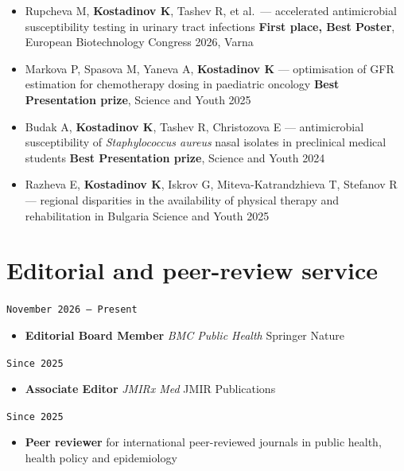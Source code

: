 \documentclass[
  10.5pt,
  a4paper,
  DIV=11,
  numbers=noendperiod]{scrartcl}
\providecommand{\tightlist}{%
  \setlength{\itemsep}{0pt}\setlength{\parskip}{0pt}}
\let\oldtexttt\texttt
\renewcommand{\texttt}[1]{{\color{cvbronze}\small\oldtexttt{#1}}}
\begin{document}
\begin{itemize}
\tightlist
\item
  Rupcheva M, \textbf{Kostadinov K}, Tashev R, et al.~--- accelerated
  antimicrobial susceptibility testing in urinary tract infections
  \textbar{} \textbf{First place, Best Poster}, European Biotechnology
  Congress 2026, Varna
\item
  Markova P, Spasova M, Yaneva A, \textbf{Kostadinov K} --- optimisation
  of GFR estimation for chemotherapy dosing in paediatric oncology
  \textbar{} \textbf{Best Presentation prize}, Science and Youth 2025
\item
  Budak A, \textbf{Kostadinov K}, Tashev R, Christozova E ---
  antimicrobial susceptibility of \emph{Staphylococcus aureus} nasal
  isolates in preclinical medical students \textbar{} \textbf{Best
  Presentation prize}, Science and Youth 2024
\item
  Razheva E, \textbf{Kostadinov K}, Iskrov G, Miteva-Katrandzhieva T,
  Stefanov R --- regional disparities in the availability of physical
  therapy and rehabilitation in Bulgaria \textbar{} Science and Youth
  2025
\end{itemize}

\section{Editorial and peer-review
service}\label{editorial-and-peer-review-service}

\texttt{November\ 2026\ –\ Present}

\begin{itemize}
\tightlist
\item
  \textbf{Editorial Board Member} \textbar{} \emph{BMC Public Health}
  \textbar{} Springer Nature
\end{itemize}

\texttt{Since\ 2025}

\begin{itemize}
\tightlist
\item
  \textbf{Associate Editor} \textbar{} \emph{JMIRx Med} \textbar{} JMIR
  Publications
\end{itemize}

\texttt{Since\ 2025}

\begin{itemize}
\tightlist
\item
  \textbf{Peer reviewer} for international peer-reviewed journals in
  public health, health policy and epidemiology
\end{itemize}
\end{document}
